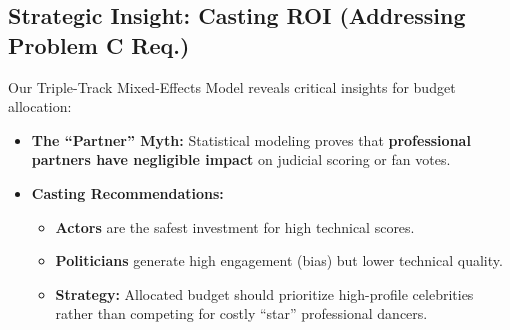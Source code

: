 \documentclass{article}
\begin{document}
\subsection*{Strategic Insight: Casting ROI (Addressing Problem C Req.)}
Our Triple-Track Mixed-Effects Model reveals critical insights for budget allocation:
\begin{itemize}
    \item \textbf{The ``Partner'' Myth:} Statistical modeling proves that \textbf{professional partners have negligible impact} on judicial scoring or fan votes.
    \item \textbf{Casting Recommendations:}
    \begin{itemize}
        \item \textbf{Actors} are the safest investment for high technical scores.
        \item \textbf{Politicians} generate high engagement (bias) but lower technical quality.
        \item \textbf{Strategy:} Allocated budget should prioritize high-profile celebrities rather than competing for costly ``star'' professional dancers.
    \end{itemize}
\end{itemize}

\vspace{-0.5em}
\end{document}
